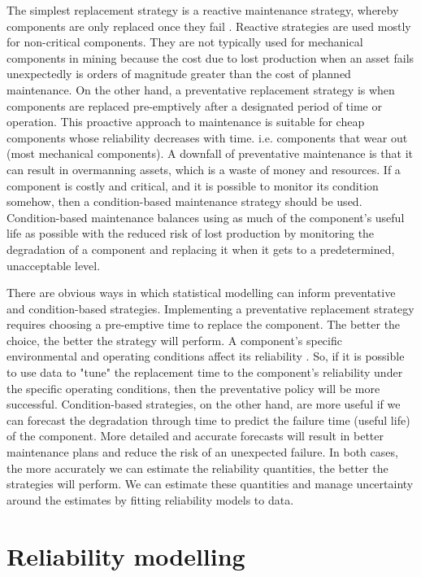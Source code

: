 The simplest replacement strategy is a reactive maintenance strategy, whereby components are only replaced once they fail \citep{heng2009}. Reactive strategies are used mostly for non-critical components. They are not typically used for mechanical components in mining because the cost due to lost production when an asset fails unexpectedly is orders of magnitude greater than the cost of planned maintenance. On the other hand, a preventative replacement strategy is when components are replaced pre-emptively after a designated period of time or operation. This proactive approach to maintenance is suitable for cheap components whose reliability decreases with time. i.e. components that wear out (most mechanical components). A downfall of preventative maintenance is that it can result in overmanning assets, which is a waste of money and resources. If a component is costly and critical, and it is possible to monitor its condition somehow, then a condition-based maintenance strategy should be used. Condition-based maintenance balances using as much of the component's useful life as possible with the reduced risk of lost production by monitoring the degradation of a component and replacing it when it gets to a predetermined, unacceptable level.

There are obvious ways in which statistical modelling can inform preventative and condition-based strategies. Implementing a preventative replacement strategy requires choosing a pre-emptive time to replace the component. The better the choice, the better the strategy will perform. A component's specific environmental and operating conditions affect its reliability \citep{meeker2022}. So, if it is possible to use data to "tune" the replacement time to the component's reliability under the specific operating conditions, then the preventative policy will be more successful. Condition-based strategies, on the other hand, are more useful if we can forecast the degradation through time to predict the failure time (useful life) of the component. More detailed and accurate forecasts will result in better maintenance plans and reduce the risk of an unexpected failure. In both cases, the more accurately we can estimate the reliability quantities, the better the strategies will perform. We can estimate these quantities and manage uncertainty around the estimates by fitting reliability models to data.

\section{Reliability modelling}
\label{sec:reliability}

